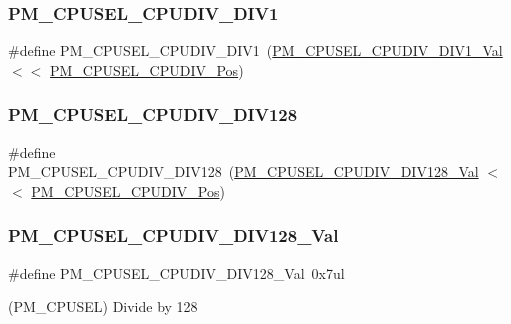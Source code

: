 \subsubsection{\texorpdfstring{PM\_CPUSEL\_CPUDIV\_DIV1}{PM\_CPUSEL\_CPUDIV\_DIV1}}
{\footnotesize\ttfamily \#define P\+M\+\_\+\+C\+P\+U\+S\+E\+L\+\_\+\+C\+P\+U\+D\+I\+V\+\_\+\+D\+I\+V1~(\mbox{\hyperlink{group___s_a_m_d21___p_m_ga1d79dfe939514654161cb9bfa85ba5b7}{P\+M\+\_\+\+C\+P\+U\+S\+E\+L\+\_\+\+C\+P\+U\+D\+I\+V\+\_\+\+D\+I\+V1\+\_\+\+Val}}     $<$$<$ \mbox{\hyperlink{group___s_a_m_d21___p_m_ga06001ff79ade30f0557224810a94c5e1}{P\+M\+\_\+\+C\+P\+U\+S\+E\+L\+\_\+\+C\+P\+U\+D\+I\+V\+\_\+\+Pos}})}

\mbox{\label{group___s_a_m_d21___p_m_ga20c3e32a67ac7a415858d6b2b36e0062}} 
\subsubsection{\texorpdfstring{PM\_CPUSEL\_CPUDIV\_DIV128}{PM\_CPUSEL\_CPUDIV\_DIV128}}
{\footnotesize\ttfamily \#define P\+M\+\_\+\+C\+P\+U\+S\+E\+L\+\_\+\+C\+P\+U\+D\+I\+V\+\_\+\+D\+I\+V128~(\mbox{\hyperlink{group___s_a_m_d21___p_m_ga938d0dc17eb7f696a8a4b159bcd4721d}{P\+M\+\_\+\+C\+P\+U\+S\+E\+L\+\_\+\+C\+P\+U\+D\+I\+V\+\_\+\+D\+I\+V128\+\_\+\+Val}}   $<$$<$ \mbox{\hyperlink{group___s_a_m_d21___p_m_ga06001ff79ade30f0557224810a94c5e1}{P\+M\+\_\+\+C\+P\+U\+S\+E\+L\+\_\+\+C\+P\+U\+D\+I\+V\+\_\+\+Pos}})}

\mbox{\label{group___s_a_m_d21___p_m_ga938d0dc17eb7f696a8a4b159bcd4721d}} 
\subsubsection{\texorpdfstring{PM\_CPUSEL\_CPUDIV\_DIV128\_Val}{PM\_CPUSEL\_CPUDIV\_DIV128\_Val}}
{\footnotesize\ttfamily \#define P\+M\+\_\+\+C\+P\+U\+S\+E\+L\+\_\+\+C\+P\+U\+D\+I\+V\+\_\+\+D\+I\+V128\+\_\+\+Val~0x7ul}



(P\+M\+\_\+\+C\+P\+U\+S\+EL) Divide by 128 

